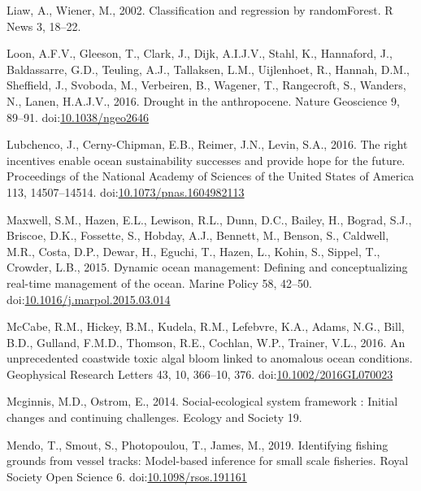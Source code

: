 \documentclass[]{elsarticle} %
\begin{document}
\leavevmode\hypertarget{ref-Wiener2003}{}%
Liaw, A., Wiener, M., 2002. Classification and regression by
randomForest. R News 3, 18--22.

\leavevmode\hypertarget{ref-VanLoon2016}{}%
Loon, A.F.V., Gleeson, T., Clark, J., Dijk, A.I.J.V., Stahl, K.,
Hannaford, J., Baldassarre, G.D., Teuling, A.J., Tallaksen, L.M.,
Uijlenhoet, R., Hannah, D.M., Sheffield, J., Svoboda, M., Verbeiren, B.,
Wagener, T., Rangecroft, S., Wanders, N., Lanen, H.A.J.V., 2016. Drought
in the anthropocene. Nature Geoscience 9, 89--91.
doi:\href{https://doi.org/10.1038/ngeo2646}{10.1038/ngeo2646}

\leavevmode\hypertarget{ref-Lubchenco2016}{}%
Lubchenco, J., Cerny-Chipman, E.B., Reimer, J.N., Levin, S.A., 2016. The
right incentives enable ocean sustainability successes and provide hope
for the future. Proceedings of the National Academy of Sciences of the
United States of America 113, 14507--14514.
doi:\href{https://doi.org/10.1073/pnas.1604982113}{10.1073/pnas.1604982113}

\leavevmode\hypertarget{ref-Maxwell2015}{}%
Maxwell, S.M., Hazen, E.L., Lewison, R.L., Dunn, D.C., Bailey, H.,
Bograd, S.J., Briscoe, D.K., Fossette, S., Hobday, A.J., Bennett, M.,
Benson, S., Caldwell, M.R., Costa, D.P., Dewar, H., Eguchi, T., Hazen,
L., Kohin, S., Sippel, T., Crowder, L.B., 2015. Dynamic ocean
management: Defining and conceptualizing real-time management of the
ocean. Marine Policy 58, 42--50.
doi:\href{https://doi.org/10.1016/j.marpol.2015.03.014}{10.1016/j.marpol.2015.03.014}

\leavevmode\hypertarget{ref-McCabe2016a}{}%
McCabe, R.M., Hickey, B.M., Kudela, R.M., Lefebvre, K.A., Adams, N.G.,
Bill, B.D., Gulland, F.M.D., Thomson, R.E., Cochlan, W.P., Trainer,
V.L., 2016. An unprecedented coastwide toxic algal bloom linked to
anomalous ocean conditions. Geophysical Research Letters 43, 10,
366--10, 376.
doi:\href{https://doi.org/10.1002/2016GL070023}{10.1002/2016GL070023}

\leavevmode\hypertarget{ref-Mcginnis2014}{}%
Mcginnis, M.D., Ostrom, E., 2014. Social-ecological system framework :
Initial changes and continuing challenges. Ecology and Society 19.

\leavevmode\hypertarget{ref-Mendo2019}{}%
Mendo, T., Smout, S., Photopoulou, T., James, M., 2019. Identifying
fishing grounds from vessel tracks: Model-based inference for small
scale fisheries. Royal Society Open Science 6.
doi:\href{https://doi.org/10.1098/rsos.191161}{10.1098/rsos.191161}
\end{document}
